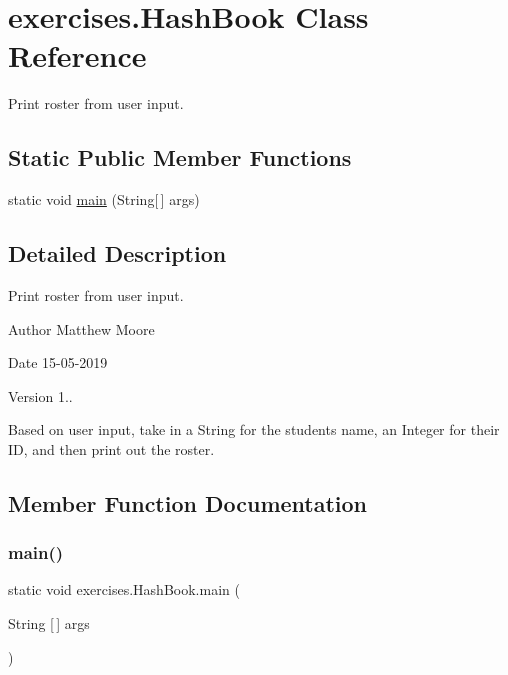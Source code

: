 \hypertarget{classexercises_1_1_hash_book}{}\section{exercises.\+Hash\+Book Class Reference}
\label{classexercises_1_1_hash_book}


Print roster from user input.  


\subsection*{Static Public Member Functions}
\begin{DoxyCompactItemize}
\item 
static void \mbox{\hyperlink{classexercises_1_1_hash_book_a6768765511628e29829e3062a43c1d15}{main}} (String\mbox{[}$\,$\mbox{]} args)
\end{DoxyCompactItemize}


\subsection{Detailed Description}
Print roster from user input. 

\begin{DoxyAuthor}{Author}
Matthew Moore 
\end{DoxyAuthor}
\begin{DoxyDate}{Date}
15-\/05-\/2019 
\end{DoxyDate}
\begin{DoxyVersion}{Version}
1..
\end{DoxyVersion}
Based on user input, take in a String for the student\textquotesingle{}s name, an Integer for their ID, and then print out the roster. 

\subsection{Member Function Documentation}
\mbox{\label{classexercises_1_1_hash_book_a6768765511628e29829e3062a43c1d15}} 
\subsubsection{\texorpdfstring{main()}{main()}}
{\footnotesize\ttfamily static void exercises.\+Hash\+Book.\+main (\begin{DoxyParamCaption}\item[{String \mbox{[}$\,$\mbox{]}}]{args }\end{DoxyParamCaption})\hspace{0.3cm}{\ttfamily [static]}}

